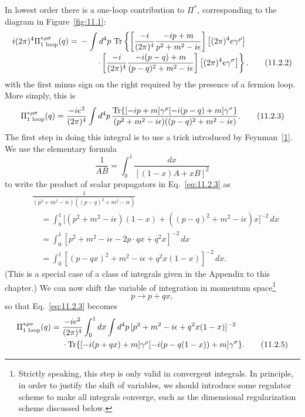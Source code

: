 In lowest order there is a one-loop contribution to $\Pi^*$, corresponding
to the diagram in Figure~\ref{fig:11.1}:
\begin{align}
  i(2\pi)^4\Pi_{\text{1 loop}}^{*\rho\sigma}(q)
  ={}&-\int d^4p\,\operatorname{Tr}\left\{
  \left[\frac{-i}{(2\pi)^4}\frac{-i\sl{p}+m}{p^2+m^2-i\epsilon}\right]
  \left[(2\pi)^4e\gamma^\rho\right]
  \right.\notag\\[-2pt]
  &\left.\qquad\cdot
  \left[\frac{-i}{(2\pi)^4}
  \frac{-i(\sl{p}-\sl{q})+m}{(p-q)^2+m^2-i\epsilon}\right]
  \left[(2\pi)^4e\gamma^\sigma\right]\right\}.
  \tag{11.2.2}\label{eq:11.2.2}
\end{align}
with the first minus sign on the right required by the presence of a fermion
loop. More simply, this is
\begin{equation}
  \Pi_{\text{1 loop}}^{*\rho\sigma}(q)
  =\frac{-i e^2}{(2\pi)^4}\int d^4p\,
  \frac{\operatorname{Tr}\{[-i\sl{p}+m]\gamma^\rho
  [-i(\sl{p}-\sl{q})+m]\gamma^\sigma\}}
  {(p^2+m^2-i\epsilon)((p-q)^2+m^2-i\epsilon)}.
  \tag{11.2.3}\label{eq:11.2.3}
\end{equation}
The first step in doing this integral is to use a trick introduced by
Feynman~\hyperref[ref:11.1]{[1]}. We use the elementary formula
\begin{equation}
  \frac1{AB}=\int_0^1\frac{dx}{[(1-x)A+xB]^2}
  \tag{11.2.4}\label{eq:11.2.4}
\end{equation}
to write the product of scalar propagators in Eq.~\eqref{eq:11.2.3} as
\begin{align*}
  &\frac1{(p^2+m^2-i\epsilon)((p-q)^2+m^2-i\epsilon)}\\
  &\quad=\int_0^1\bigl[(p^2+m^2-i\epsilon)(1-x)
  +((p-q)^2+m^2-i\epsilon)x\bigr]^{-2}\,dx\\
  &\quad=\int_0^1[p^2+m^2-i\epsilon-2p\cdot qx+q^2x]^{-2}\,dx\\
  &\quad=\int_0^1[(p-qx)^2+m^2-i\epsilon+q^2x(1-x)]^{-2}\,dx.
\end{align*}
(This is a special case of a class of integrals given in the Appendix to
this chapter.) We can now shift the variable of integration in momentum
space\footnote{Strictly speaking, this step is only valid in convergent integrals.
In principle, in order to justify the shift of variables, we should introduce
some regulator scheme to make all integrals converge, such as the dimensional
regularization scheme discussed below.}
\[
  p\longrightarrow p+qx,
\]
so that Eq.~\eqref{eq:11.2.3} becomes
\begin{align}
  \Pi_{\text{1 loop}}^{*\rho\sigma}(q)
  ={}&\frac{-i e^2}{(2\pi)^4}\int_0^1dx\int d^4p\,
  [p^2+m^2-i\epsilon+q^2x(1-x)]^{-2}\notag\\
  &\cdot\operatorname{Tr}\{[-i(\sl{p}+\sl{q}x)+m]\gamma^\rho
  [-i(\sl{p}-\sl{q}(1-x))+m]\gamma^\sigma\}.
  \tag{11.2.5}\label{eq:11.2.5}
\end{align}
